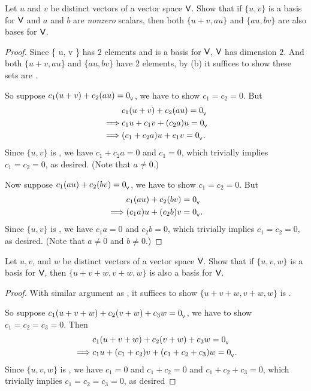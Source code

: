 \begin{exercise} \label{exercise 1.6.11}
Let \(u\) and \(v\) be distinct vectors of a vector space \(\textsf{V}\).
Show that if \(\{ u, v \}\) is a basis for \(\textsf{V}\) and \(a\) and \(b\) are \emph{nonzero} scalars,
then both \(\{ u + v, au \}\) and \(\{ au, bv \}\) are also bases for \(\textsf{V}\).
\end{exercise}

\begin{proof}
Since \{ u, v \} has \(2\) elements and is a basis for \(\textsf{V}\), \(\textsf{V}\) has dimension \(2\).
And both \(\{ u + v, au \}\) and \(\{ au, bv \}\) have \(2\) elements, by (b) it suffices to show these sets are \LID{}.

So suppose \(c_1 (u + v) + c_2 (au) = 0_{_{\textsf{V}}}\), we have to show \(c_1 = c_2 = 0\).
But
\begin{align*}
             & c_1 (u + v) + c_2 (au) = 0_{_{\textsf{V}}} \\
    \implies & c_1 u + c_1 v + (c_2 a) u = 0_{_{\textsf{V}}} \\
    \implies & (c_1 + c_2 a) u + c_1 v = 0_{_{\textsf{V}}}.
\end{align*}
Since \(\{ u, v \}\) is \LID{}, we have \(c_1 + c_2 a = 0\) and \(c_1 = 0\), which trivially implies \(c_1 = c_2 = 0\), as desired. (Note that \(a \ne 0\).)

Now suppose \(c_1 (au) + c_2 (bv) = 0_{_{\textsf{V}}}\), we have to show \(c_1 = c_2 = 0\).
But
\begin{align*}
             & c_1 (au) + c_2 (bv) = 0_{_{\textsf{V}}} \\
    \implies & (c_1 a) u + (c_2 b) v = 0_{_{\textsf{V}}}.
\end{align*}
Since \(\{ u, v \}\) is \LID{}, we have \(c_1 a = 0\) and \(c_2 b = 0\), which trivially implies \(c_1 = c_2 = 0\), as desired. (Note that \(a \ne 0\) and \(b \ne 0\).)
\end{proof}

\begin{exercise} \label{exercise 1.6.12}
Let \(u, v\), and \(w\) be distinct vectors of a vector space \(\textsf{V}\).
Show that if \(\{ u, v, w \}\) is a basis for \(\textsf{V}\), then \(\{ u + v + w, v + w, w \}\) is also a basis for \(\textsf{V}\).
\end{exercise}

\begin{proof}
With similar argument as , it suffices to show \(\{ u + v + w, v + w, w \}\) is \LID{}.

So suppose \(c_1(u + v + w) + c_2(v + w) + c_3w = 0_{_{\textsf{V}}}\), we have to show \(c_1 = c_2 = c_3 = 0\).
Then
\begin{align*}
             & c_1(u + v + w) + c_2(v + w) + c_3w = 0_{_{\textsf{V}}} \\
    \implies & c_1 u + (c_1 + c_2) v + (c_1 + c_2 + c_3) w = 0_{_{\textsf{V}}}.
\end{align*}
Since \(\{ u, v, w \}\) is \LID{}, we have \(c_1 = 0\) and \(c_1 + c_2 = 0\) and \(c_1 + c_2 + c_3 = 0\), which trivially implies \(c_1 = c_2 = c_3 = 0\), as desired
\end{proof}

